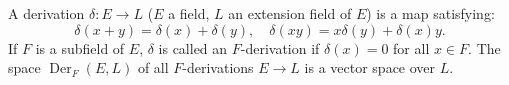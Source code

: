 A derivation $\delta: E \rightarrow L$ ($E$ a field, $L$ an extension field of $E$) is a map satisfying:
$$\delta(x + y) = \delta(x) + \delta(y), \quad \delta(xy) = x\delta(y) + \delta(x)y.$$
If $F$ is a subfield of $E$, $\delta$ is called an $F$-derivation if $\delta(x) = 0$ for all $x \in F$.
The space $\operatorname{Der}_F(E, L)$ of all $F$-derivations $E \rightarrow L$ is a vector space over $L$.
